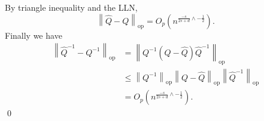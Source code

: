 \documentclass[11pt]{article}
\begin{document}
By triangle inequality and the LLN,
\begin{equation}
    \left\|\hat{Q} - Q\right\|_{\text{op}} = O_p\left(n^{\frac{-s}{2s+d} \wedge -\frac{1}{2}}\right).
\end{equation}
Finally we have
\begin{align}
    \left\|\hat{Q}^{-1} - Q^{-1}\right\|_{\text{op}} &= \left\|Q^{-1}\left(Q - \hat{Q}\right)\hat{Q}^{-1}\right\|_{\text{op}} \\
    &\leq \left\|Q^{-1}\right\|_{\text{op}}\left\|Q - \hat{Q}\right\|_{\text{op}}\left\|\hat{Q}^{-1}\right\|_{\text{op}}\\
    &= O_p\left(n^{\frac{-s}{2s+d} \wedge -\frac{1}{2}}\right).
\end{align}
\qed{}

\end{document}
